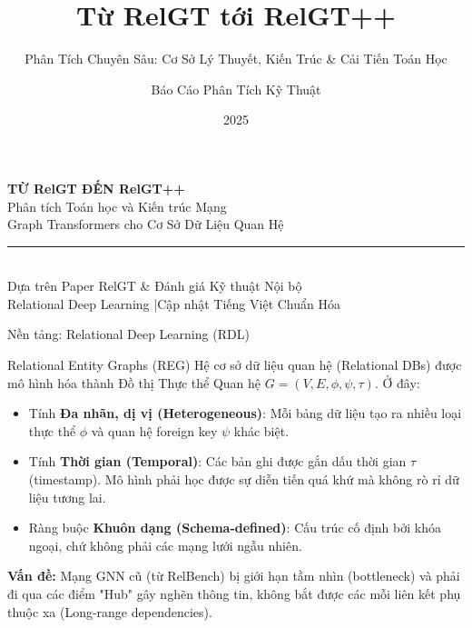 \documentclass[aspectratio=169,11pt]{beamer}
\title{Từ RelGT tới RelGT++}
\subtitle{Phân Tích Chuyên Sâu: Cơ Sở Lý Thuyết, Kiến Trúc \& Cải Tiến Toán Học}
\author{Báo Cáo Phân Tích Kỹ Thuật}
\institute{
  Graph Transformers in Relational Deep Learning \& Code Analysis
}
\date{2025}
\begin{document}
{
\begin{frame}[plain]
\vspace{1.5cm}


\begin{center}
{\Huge\bfseries\color{white} TỪ RelGT ĐẾN RelGT++}\\[12pt]
{\large\color{hcmuslight} Phân tích Toán học và Kiến trúc Mạng\\[4pt]
Graph Transformers cho Cơ Sở Dữ Liệu Quan Hệ}\\[20pt]
{\small\color{hcmusgold}\rule{4cm}{0.5pt}}\\[12pt]
{\small\color{hcmuslight} Dựa trên Paper RelGT \& Đánh giá Kỹ thuật Nội bộ}\\[16pt]
{\scriptsize\color{softgray} Relational Deep Learning \quad|\quad Cập nhật Tiếng Việt Chuẩn Hóa }
\end{center}
\end{frame}
}

\begin{frame}{Nền tảng: Relational Deep Learning (RDL)}
\begin{block}{Relational Entity Graphs (REG)}
Hệ cơ sở dữ liệu quan hệ (Relational DBs) được mô hình hóa thành Đồ thị Thực thể Quan hệ $G=(V, E, \phi, \psi, \tau)$. Ở đây:
\begin{itemize}
    \item Tính \textbf{Đa nhãn, dị vị (Heterogeneous)}: Mỗi bảng dữ liệu tạo ra nhiều loại thực thể $\phi$ và quan hệ foreign key $\psi$ khác biệt.
    \item Tính \textbf{Thời gian (Temporal)}: Các bản ghi được gắn dấu thời gian $\tau$ (timestamp). Mô hình phải học được sự diễn tiến quá khứ mà không rò rỉ dữ liệu tương lai.
    \item Ràng buộc \textbf{Khuôn dạng (Schema-defined)}: Cấu trúc cố định bởi khóa ngoại, chứ không phải các mạng lưới ngẫu nhiên.
\end{itemize}
\end{block}
\vspace{5pt}
\centering
\textbf{Vấn đề:} Mạng GNN cũ (từ RelBench) bị giới hạn tầm nhìn (bottleneck) và phải đi qua các điểm "Hub" gây nghẽn thông tin, không bắt được các mỗi liên kết phụ thuộc xa (Long-range dependencies).
\end{frame}
\end{document}
